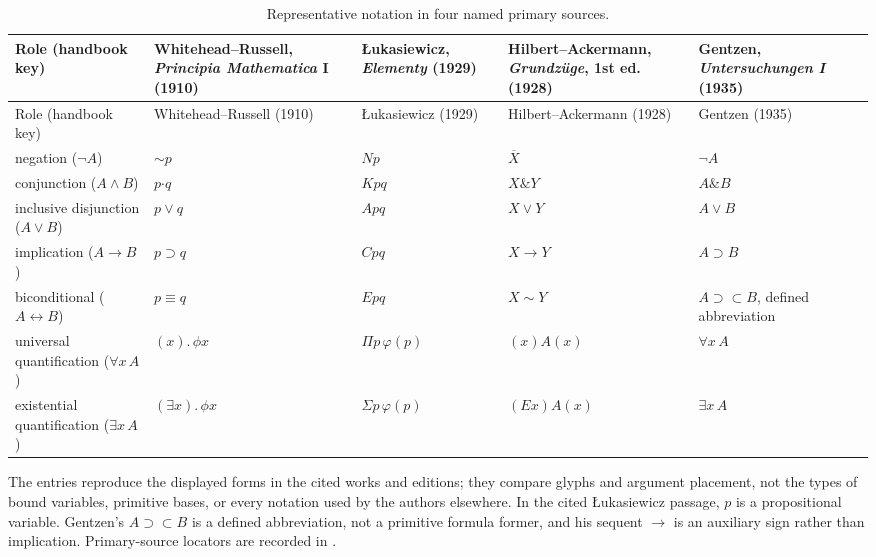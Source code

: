 \begingroup\scriptsize\setlength{\tabcolsep}{3pt}
\begin{longtable}{@{}p{}p{}p{}p{}p{}@{}}
\caption{Representative notation in four named primary sources.}
\label{tab:p01-notation-variants}\\
\toprule
Role (handbook key) & Whitehead--Russell, \emph{Principia Mathematica} I (1910) & {\L}ukasiewicz, \emph{Elementy} (1929) & Hilbert--Ackermann, \emph{Grundz\"uge}, 1st ed. (1928) & Gentzen, \emph{Untersuchungen I} (1935) \\
\midrule
\endfirsthead
\toprule
Role (handbook key) & Whitehead--Russell (1910) & {\L}ukasiewicz (1929) & Hilbert--Ackermann (1928) & Gentzen (1935) \\
\midrule
\endhead
negation (\(\neg A\)) & \(\mathord{\sim}p\) & \(Np\) & \(\overline X\) & \(\neg A\) \\
conjunction (\(A\land B\)) & \(p\mathbin{\boldsymbol{\cdot}}q\) & \(Kpq\) & \(X\mathbin{\&}Y\) & \(A\mathbin{\&}B\) \\
inclusive disjunction (\(A\lor B\)) & \(p\lor q\) & \(Apq\) & \(X\lor Y\) & \(A\lor B\) \\
implication (\(A\to B\)) & \(p\supset q\) & \(Cpq\) & \(X\to Y\) & \(A\supset B\) \\
biconditional (\(A\leftrightarrow B\)) & \(p\equiv q\) & \(Epq\) & \(X\sim Y\) & \(A\supset\subset B\), defined abbreviation \\
universal quantification (\(\forall x\,A\)) & \((x).\,\phi x\) & \(\Pi p\,\varphi(p)\) & \((x)A(x)\) & \(\forall x\,A\) \\
existential quantification (\(\exists x\,A\)) & \((\exists x).\,\phi x\) & \(\Sigma p\,\varphi(p)\) & \((E x)A(x)\) & \(\exists x\,A\) \\
\bottomrule
\end{longtable}
\endgroup

The entries reproduce the displayed forms in the cited works and editions;
they compare glyphs and argument placement, not the types of bound variables,
primitive bases, or every notation used by the authors elsewhere.  In the
cited {\L}ukasiewicz passage, \(p\) is a propositional variable.  Gentzen's
\(A\supset\subset B\) is a defined abbreviation, not a primitive formula
former, and his sequent \(\to\) is an auxiliary sign rather than implication.
Primary-source locators are recorded in
\cite{WhiteheadRussell1910,Lukasiewicz1929,HilbertAckermann1928,Gentzen1934a}.

